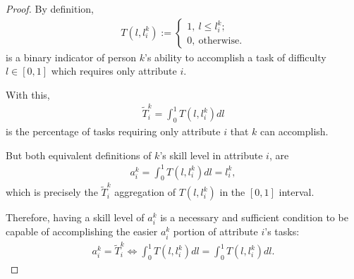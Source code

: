 \documentclass[hidelinks, nonatbib]{elsarticle}
\begin{document}
\begin{proof}
    By definition,
    \begin{gather}
        T(l, l_{i}^{k})
        :=
        \begin{cases}
            1, \ l \leq l_{i}^{k}; \\
            0, \ \text{otherwise.}
        \end{cases}
    \end{gather}
    is a binary indicator of person $k$'s ability to accomplish a task of difficulty $l \in [0,1]$ which requires only attribute $i$.
    
    With this,
    \begin{gather}
        \tilde{T}_{i}^{k}
        =
        \int_{0}^{1}{
        T(l, l_{i}^{k})
        dl
        }
    \end{gather}
    is the percentage of tasks requiring only attribute $i$ that $k$ can accomplish.

    But both equivalent definitions of $k$'s skill level in attribute $i$, are
    \begin{gather}
        a_{i}^{k} = 
        \int_{0}^{1}{
        T(l, l_{i}^{k})
        dl
        }
        =
        l_{i}^{k}
        ,
    \end{gather}
    which is precisely the $\tilde{T}_{i}^{k}$ aggregation of $T(l, l_{i}^{k})$ in the $[0,1]$ interval.

    Therefore, having a skill level of $a_{i}^{k}$ is a necessary and sufficient condition to be capable of accomplishing the easier $a_{i}^{k}$ portion of attribute $i$'s tasks:
    \begin{gather}
        a_{i}^{k} =
        \tilde{T}_{i}^{k}
        \iff
        \int_{0}^{1}{
        T(l, l_{i}^{k})
        dl
        } =
        \int_{0}^{1}{
        T(l, l_{i}^{k})
        dl
        }
        .
    \end{gather}
\end{proof}
\end{document}

